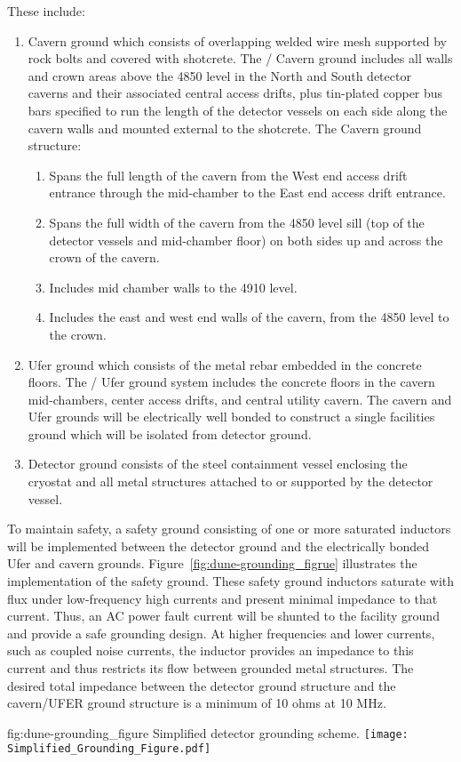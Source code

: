 These include:
\begin{enumerate}
 \item Cavern ground which consists of overlapping welded wire mesh
   supported by rock bolts and covered with shotcrete. The
   / Cavern ground includes all walls and
   crown areas above the 4850 level in the North and South detector
   caverns and their associated central access drifts, plus tin-plated
   copper bus bars specified to run the length of the detector vessels
   on each side along the cavern walls and mounted external to the
   shotcrete.  The Cavern ground structure:
\begin{enumerate}
 \item Spans the full length of the cavern from the West end access
   drift entrance through the mid-chamber to the East end access drift
   entrance.
 \item Spans the full width of the cavern from the 4850 level sill
   (top of the detector vessels and mid-chamber floor) on both sides
   up and across the crown of the cavern.
 \item Includes mid chamber walls to the 4910 level.
 \item Includes the east and west end walls of the cavern, from the
   4850 level to the crown.
\end{enumerate}
 \item Ufer ground which consists of the metal rebar embedded in the
   concrete floors. The / Ufer ground system
   includes the concrete floors in the cavern mid-chambers, center
   access drifts, and central utility cavern. The cavern and Ufer
   grounds will be electrically well bonded to construct a single
   facilities ground which will be isolated from detector ground.
 \item Detector ground consists of the steel containment vessel
   enclosing the cryostat and all metal structures attached to or
   supported by the detector vessel.
\end{enumerate}

To maintain safety, a safety ground consisting of one or more
saturated inductors will be implemented between the detector ground
and the electrically bonded Ufer and cavern grounds.
Figure~\ref{fig:dune-grounding_figrue} illustrates the implementation
of the safety ground. These safety ground inductors saturate with flux
under low-frequency high currents and present minimal impedance to
that current.  Thus, an AC power fault current will be shunted to the
facility ground and provide a safe grounding design. At higher
frequencies and lower currents, such as coupled noise currents, the
inductor provides an impedance to this current and thus restricts its
flow between grounded metal structures. The desired total impedance
between the detector ground structure and the cavern/UFER ground
structure is a minimum of 10 ohms at 10 MHz.
\begin{dunefigure}{fig:dune-grounding_figure}
  {Simplified detector grounding scheme.}
  \texttt{[image: Simplified\_Grounding\_Figure.pdf]}
\end{dunefigure}


